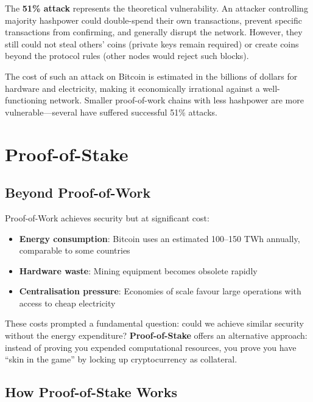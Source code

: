 \documentclass[11pt,a4paper]{article}
\newcommand{\keyword}[1]{\textbf{\textcolor{AccentOrange}{#1}}}
\begin{document}
The \keyword{51\% attack} represents the theoretical vulnerability. An attacker controlling majority hashpower could double-spend their own transactions, prevent specific transactions from confirming, and generally disrupt the network. However, they still could not steal others' coins (private keys remain required) or create coins beyond the protocol rules (other nodes would reject such blocks).

The cost of such an attack on Bitcoin is estimated in the billions of dollars for hardware and electricity, making it economically irrational against a well-functioning network. Smaller proof-of-work chains with less hashpower are more vulnerable---several have suffered successful 51\% attacks.

\section{Proof-of-Stake}

\subsection{Beyond Proof-of-Work}

Proof-of-Work achieves security but at significant cost:

\begin{itemize}
    \item \textbf{Energy consumption}: Bitcoin uses an estimated 100--150 TWh annually, comparable to some countries
    \item \textbf{Hardware waste}: Mining equipment becomes obsolete rapidly
    \item \textbf{Centralisation pressure}: Economies of scale favour large operations with access to cheap electricity
\end{itemize}

These costs prompted a fundamental question: could we achieve similar security without the energy expenditure? \keyword{Proof-of-Stake} offers an alternative approach: instead of proving you expended computational resources, you prove you have ``skin in the game'' by locking up cryptocurrency as collateral.

\subsection{How Proof-of-Stake Works}
\end{document}
